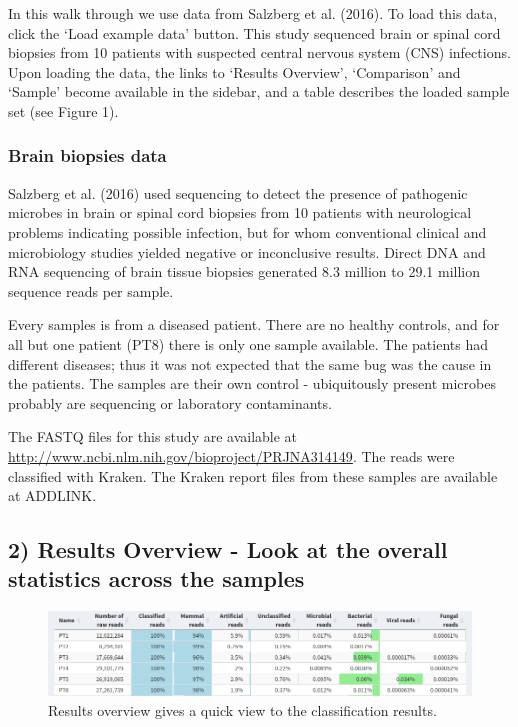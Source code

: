 \documentclass[]{article}
\begin{document}
In this walk through we use data from Salzberg et al. (2016). To load
this data, click the `Load example data' button. This study sequenced
brain or spinal cord biopsies from 10 patients with suspected central
nervous system (CNS) infections. Upon loading the data, the links to
`Results Overview', `Comparison' and `Sample' become available in the
sidebar, and a table describes the loaded sample set (see Figure 1).

\subsubsection{Brain biopsies data}\label{brain-biopsies-data}

Salzberg et al. (2016) used sequencing to detect the presence of
pathogenic microbes in brain or spinal cord biopsies from 10 patients
with neurological problems indicating possible infection, but for whom
conventional clinical and microbiology studies yielded negative or
inconclusive results. Direct DNA and RNA sequencing of brain tissue
biopsies generated 8.3 million to 29.1 million sequence reads per
sample.

Every samples is from a diseased patient. There are no healthy controls,
and for all but one patient (PT8) there is only one sample available.
The patients had different diseases; thus it was not expected that the
same bug was the cause in the patients. The samples are their own
control - ubiquitously present microbes probably are sequencing or
laboratory contaminants.

The FASTQ files for this study are available at
\url{http://www.ncbi.nlm.nih.gov/bioproject/PRJNA314149}. The reads were
classified with Kraken. The Kraken report files from these samples are
available at ADDLINK.

\subsection{2) Results Overview - Look at the overall statistics across
the
samples}\label{results-overview---look-at-the-overall-statistics-across-the-samples}

\begin{figure}[htbp]
\centering
\includegraphics{results-overview.png}
\caption{Results overview gives a quick view to the classification
results.}
\end{figure}
\end{document}
